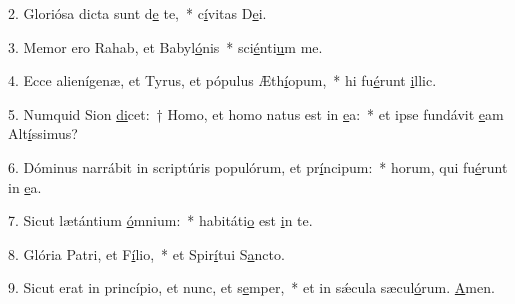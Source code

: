 2. Gloriósa dicta sunt d\uline{e} te,~* c\uline{í}vitas D\uline{e}i.\par 
3. Memor ero Rahab, et Babyl\uline{ó}nis~* sci\uline{é}nti\uline{u}m me.\par 
4. Ecce alienígenæ, et Tyrus, et pópulus Æth\uline{í}opum,~* hi fu\uline{é}runt \uline{i}llic.\par 
5. Numquid Sion \uline{di}cet:~† Homo, et homo natus est in \uline{e}a:~* et ipse fundávit \uline{e}am Alt\uline{í}ssimus?\par 
6. Dóminus narrábit in scriptúris populórum, et pr\uline{í}ncipum:~* horum, qui fu\uline{é}runt in \uline{e}a.\par 
7. Sicut lætántium \uline{ó}mnium:~* habitáti\uline{o} est \uline{i}n te.\par 
8. Glória Patri, et F\uline{í}lio,~* et Spir\uline{í}tui S\uline{a}ncto.\par 
9. Sicut erat in princípio, et nunc, et s\uline{e}mper,~* et in sǽcula sæcul\uline{ó}rum. \uline{A}men.\par 
